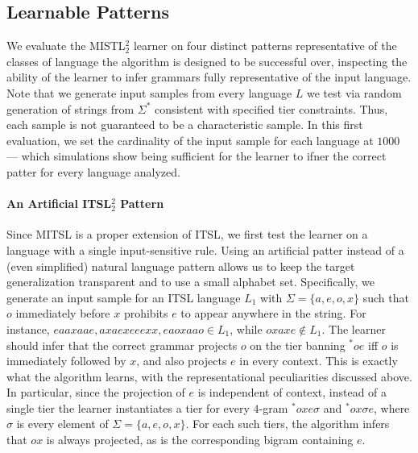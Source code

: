 \documentclass[11pt,a4paper]{article}
\begin{document}
\subsection{Learnable Patterns}

We evaluate the  MISTL$^2_2$ learner on four distinct patterns representative of the classes of language the algorithm is designed to be successful over, inspecting the ability of the learner to infer grammars fully representative of the input language.
Note that we generate input samples from every language $L$ we test via random generation of strings from $\Sigma^*$ consistent with specified tier constraints.
Thus, each sample is not guaranteed to be a characteristic sample.
In this first evaluation, we set the cardinality of the input sample for each language at $1000$ --- which simulations show being sufficient for the learner to ifner the correct patter for every language analyzed.


\paragraph{An Artificial ITSL$^2_2$ Pattern} Since MITSL is a proper extension of ITSL, we first test the learner on a language with a single input-sensitive rule. Using an artificial patter instead of a (even simplified) natural language pattern allows us to keep the target generalization transparent and to use a small alphabet set. Specifically, we generate an input sample for an ITSL language $L_1$ with $\Sigma = \{a, e, o, x\}$ such that $o$ immediately before $x$ prohibits $e$ to appear anywhere in the string. 
For instance,  $eaaxaae,axaexeeexx,eaoxaao \in L_1$, while $oxaxe \notin L_1$.
The learner should infer that the correct grammar projects $o$ on the tier banning $^*oe$ iff $o$ is immediately followed by $x$, and also projects $e$ in every context.
This is exactly what the algorithm learns, with the representational peculiarities discussed above.
In particular, since the projection of $e$ is independent of context, instead of a single tier the learner instantiates a tier for every $4$-gram  $^*oxe\sigma$ and   $^*ox\sigma e$, where $\sigma$ is every element of $\Sigma = \{a, e, o, x\}$.
For each such tiers, the algorithm infers that $ox$ is always projected, as is the corresponding bigram containing $e$.
\end{document}
